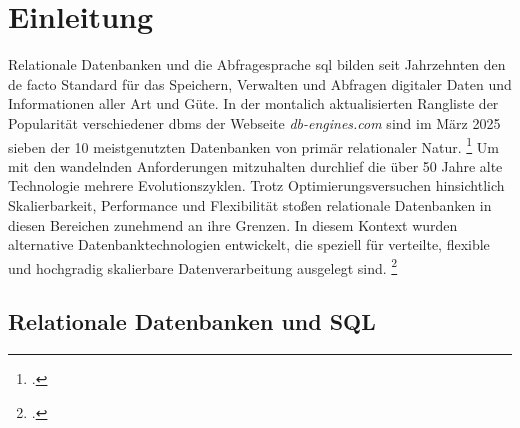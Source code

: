 \section{Einleitung}

Relationale Datenbanken und die Abfragesprache \ac{sql} bilden seit Jahrzehnten den de facto Standard für das Speichern, Verwalten und Abfragen digitaler Daten und Informationen aller Art und Güte. In der montalich aktualisierten Rangliste der Popularität verschiedener \ac{dbms} der Webseite \textit{db-engines.com} sind im März 2025 sieben der 10 meistgenutzten Datenbanken von primär relationaler Natur. \footcite{redgatesoftwareltd.DBEnginesRanking2025} Um mit den wandelnden Anforderungen mitzuhalten durchlief die über 50 Jahre alte Technologie mehrere Evolutionszyklen. Trotz Optimierungsversuchen hinsichtlich Skalierbarkeit, Performance und Flexibilität stoßen relationale Datenbanken 
in diesen Bereichen zunehmend an ihre Grenzen. In diesem Kontext wurden alternative Datenbanktechnologien entwickelt, die speziell für verteilte, flexible und hochgradig skalierbare Datenverarbeitung ausgelegt sind. \footcite[S. 13-17]{harrisonNextGenerationDatabases2015}




\subsection{Relationale Datenbanken und SQL}

